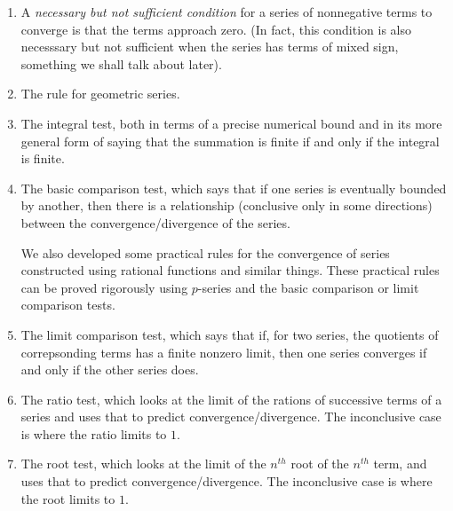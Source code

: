 \documentclass[10pt]{amsart}
\begin{document}
\begin{enumerate}
\item A {\em necessary but not sufficient condition} for a series of
  nonnegative terms to converge is that the terms approach zero. (In
  fact, this condition is also necesssary but not sufficient when the
  series has terms of mixed sign, something we shall talk about later).
\item The rule for geometric series.
\item The integral test, both in terms of a precise numerical bound
  and in its more general form of saying that the summation is finite
  if and only if the integral is finite.
\item The basic comparison test, which says that if one series is
  eventually bounded by another, then there is a relationship
  (conclusive only in some directions) between the
  convergence/divergence of the series.

  We also developed some practical rules for the convergence of series
  constructed using rational functions and similar things. These
  practical rules can be proved rigorously using $p$-series and the
  basic comparison or limit comparison tests.
\item The limit comparison test, which says that if, for two series,
  the quotients of correpsonding terms has a finite nonzero limit,
  then one series converges if and only if the other series does.
\item The ratio test, which looks at the limit of the rations of
  successive terms of a series and uses that to predict
  convergence/divergence. The inconclusive case is where the ratio
  limits to $1$.
\item The root test, which looks at the limit of the $n^{th}$ root of
  the $n^{th}$ term, and uses that to predict
  convergence/divergence. The inconclusive case is where the root
  limits to $1$.
\end{enumerate}
\end{document}
